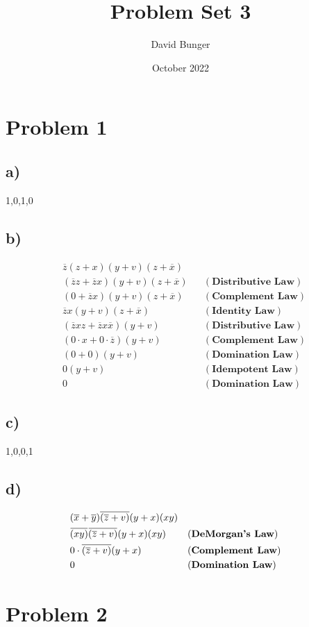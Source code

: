 \documentclass{article}
\title{Problem Set 3}
\author{David Bunger}
\date{October 2022}
\newcommand\ncoverline[1]{\mkern1mu\overline{\mkern-1mu#1\mkern-1mu}\mkern1mu}
\begin{document}
\maketitle
\section*{Problem 1}
\subsection*{a)}
1,0,1,0
\subsection*{b)}
\begin{align*}
    & \overline{z}(z+x)(y+v)(z+\overline{x})\\
    & (\overline{z}z+\overline{z}x)(y+v)(z+\overline{x}) & &(\textbf{Distributive Law})\\
    & (0+\overline{z}x)(y+v)(z+\overline{x}) & &(\textbf{Complement Law})\\
    & \overline{z}x(y+v)(z+\overline{x}) & &(\textbf{Identity Law})\\
    & (\overline{z}xz + \overline{z}x\overline{x})(y+v)& &(\textbf{Distributive Law})\\
    & (0\cdot x + 0\cdot \overline{z})(y+v)& &(\textbf{Complement Law})\\
    & (0 + 0)(y+v)& &(\textbf{Domination Law})\\
    & 0(y+v)& &(\textbf{Idempotent Law})\\
    & 0& &(\textbf{Domination Law})
\end{align*}
\subsection*{c)}
1,0,0,1
\subsection*{d)}
\begin{align*}
    & (\overline{x}+\overline{y})\overline{(\overline{z}+v)}(y+x)(xy)\\
    & \ncoverline{(xy)}\ncoverline{(\overline{z}+v)}(y+x)(xy)& &(\textbf{DeMorgan's Law})\\
    & 0\cdot\overline{(\overline{z}+v)}(y+x)& &(\textbf{Complement Law})\\
    & 0& &(\textbf{Domination Law})
\end{align*}
\section*{Problem 2}
\end{document}
